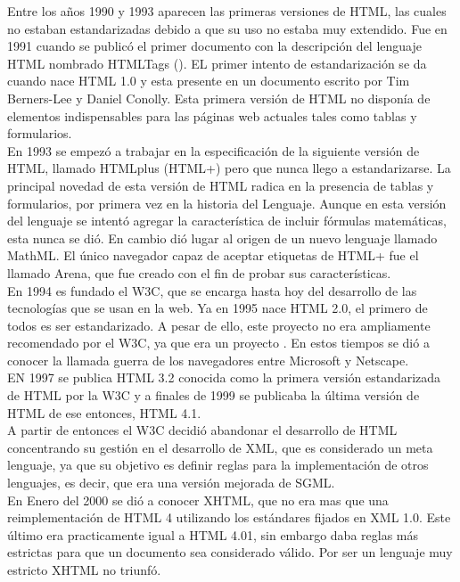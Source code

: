 \documentclass[11pt]{article} %
\begin{document}
\noindent Entre los años 1990 y 1993 aparecen las primeras versiones de HTML, las cuales no estaban estandarizadas debido a que su uso no estaba muy extendido. Fue en 1991 cuando se publicó el primer documento con la descripción del lenguaje HTML nombrado HTMLTags (). EL primer intento de estandarización se da cuando nace HTML 1.0 y esta presente en un documento escrito por Tim Berners-Lee y Daniel Conolly. Esta primera versión de HTML no disponía de elementos indispensables para las páginas web actuales tales como tablas y formularios.\\

\noindent En 1993 se empezó a trabajar en la especificación de la siguiente versión de HTML, llamado HTMLplus (HTML+) pero que nunca llego a estandarizarse. La principal novedad de esta versión de HTML radica en la presencia de tablas y formularios, por primera vez en la historia del Lenguaje. Aunque en esta versión del lenguaje se intentó agregar la característica de incluir fórmulas matemáticas, esta nunca se dió. En cambio dió lugar al origen de un nuevo lenguaje llamado MathML. El único navegador capaz de aceptar etiquetas de HTML+ fue el llamado Arena, que fue creado con el fin de probar sus características.\\

\noindent En 1994 es fundado el W3C, que se encarga hasta hoy del desarrollo de las tecnologías que se usan en la web. Ya en 1995 nace HTML 2.0, el primero de todos es ser estandarizado. A pesar de ello, este proyecto no era ampliamente recomendado por el W3C, ya que era un proyecto . En estos tiempos se dió a conocer la llamada guerra de los navegadores entre Microsoft y Netscape.\\

\noindent EN 1997 se publica HTML 3.2 conocida como la primera versión estandarizada de HTML por la W3C y a finales de 1999 se publicaba la última versión de HTML de ese entonces, HTML 4.1.\\

\noindent A partir de entonces el W3C decidió abandonar el desarrollo de HTML concentrando su gestión en el desarrollo de XML, que es considerado un meta lenguaje, ya que su objetivo es definir reglas para la implementación de otros lenguajes, es decir, que era una versión mejorada de SGML.\\

\noindent En Enero del 2000 se dió a conocer XHTML, que no era mas que una reimplementación de HTML 4 utilizando los estándares fijados en XML 1.0. Este último era practicamente igual a HTML 4.01, sin embargo daba reglas más estrictas para que un documento sea considerado válido. Por ser un lenguaje muy estricto XHTML no triunfó.\\
\end{document}
